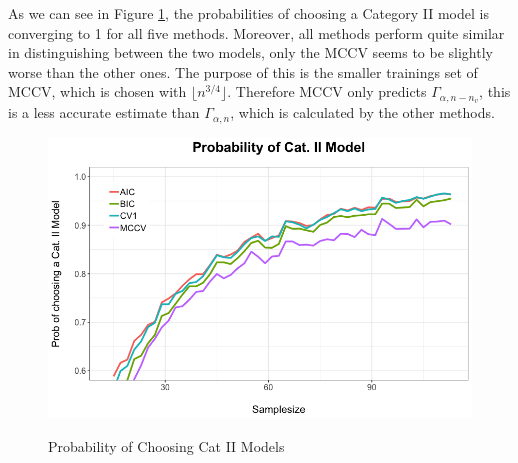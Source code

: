 \documentclass[Research_Module_ES.tex]{subfiles}
\begin{document}
As we can see in Figure \ref{Simulation1}, the probabilities of choosing a Category II model is converging to 1 for all five methods. Moreover, all methods perform quite similar in distinguishing between the two models, only the MCCV seems to be slightly worse than the other ones. The purpose of this is the smaller trainings set of MCCV, which is chosen with $\lfloor n^{3/4}\rfloor$. Therefore MCCV only predicts $\Gamma_{\alpha,n-n_v}$, this is a less accurate estimate than $\Gamma_{\alpha,n}$, which is calculated by the other methods. 
\begin{figure}[!h]
	\label{Simulation1}
	\centering
	\includegraphics[width=1\textwidth]{Simulation1.png}\\
\caption{Probability of Choosing Cat II Models}
\end{figure}
\end{document}
